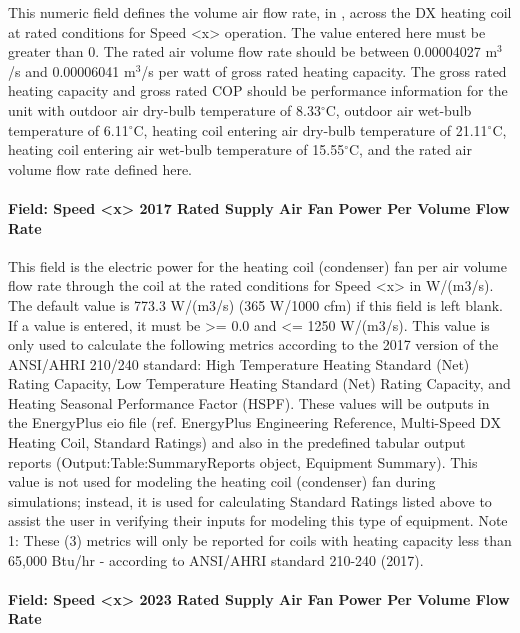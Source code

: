 This numeric field defines the volume air flow rate, in \si{\volumeFlowRate}, across the DX heating coil at rated conditions for Speed \textless{}x\textgreater{} operation. The value entered here must be greater than 0. The rated air volume flow rate should be between 0.00004027 m\(^{3}\)/s and 0.00006041 m\(^{3}\)/s per watt of gross rated heating capacity. The gross rated heating capacity and gross rated COP should be performance information for the unit with outdoor air dry-bulb temperature of 8.33$^\circ$C, outdoor air wet-bulb temperature of 6.11$^\circ$C, heating coil entering air dry-bulb temperature of 21.11$^\circ$C, heating coil entering air wet-bulb temperature of 15.55$^\circ$C, and the rated air volume flow rate defined here.

\paragraph{Field: Speed \textless{}x\textgreater{} 2017 Rated Supply Air Fan Power Per Volume Flow Rate}

This field is the electric power for the heating coil (condenser) fan per air volume flow rate through the coil at the rated conditions for Speed \textless{}x\textgreater{} in W/(m3/s). The default value is 773.3 W/(m3/s) (365 W/1000 cfm) if this field is left blank. If a value is entered, it must be \textgreater{}= 0.0 and \textless{}= 1250 W/(m3/s). This value is only used to calculate the following metrics according to the 2017 version of the ANSI/AHRI 210/240 standard: High Temperature Heating Standard (Net) Rating Capacity, Low Temperature Heating Standard (Net) Rating Capacity, and Heating Seasonal Performance Factor (HSPF). These values will be outputs in the EnergyPlus eio file (ref. EnergyPlus Engineering Reference, Multi-Speed DX Heating Coil, Standard Ratings) and also in the predefined tabular output reports (Output:Table:SummaryReports object, Equipment Summary). This value is not used for modeling the heating coil (condenser) fan during simulations; instead, it is used for calculating Standard Ratings listed above to assist the user in verifying their inputs for modeling this type of equipment.
Note 1: These (3) metrics will only be reported for coils with heating capacity less than 65,000 Btu/hr - according to ANSI/AHRI standard 210-240 (2017).

\paragraph{Field: Speed \textless{}x\textgreater{} 2023 Rated Supply Air Fan Power Per Volume Flow Rate}

